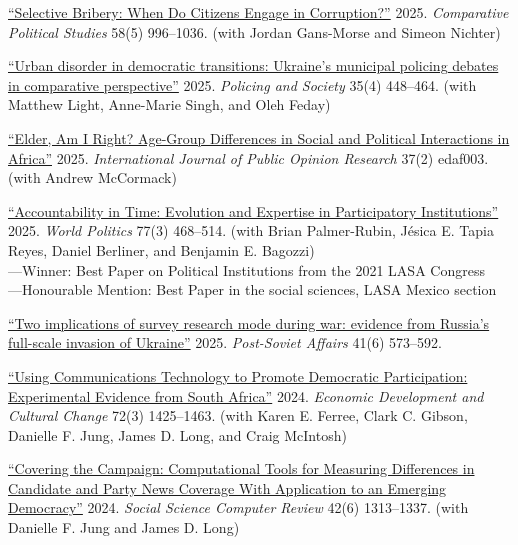 \begin{etaremune}
  \item \href{https://doi.org/10.1177/00104140241259444}{``Selective Bribery: When Do Citizens Engage in Corruption?''} 2025. \textit{Comparative Political Studies} 58(5) 996–1036. (with Jordan Gans-Morse and Simeon Nichter)

  \item \href{https://www.tandfonline.com/doi/abs/10.1080/10439463.2024.2411538}{``Urban disorder in democratic transitions: Ukraine’s municipal policing debates in comparative perspective''} 2025. \textit{Policing and Society} 35(4) 448–464. (with Matthew Light, Anne-Marie Singh, and Oleh Feday)

  \item \href{https://doi.org/10.1093/ijpor/edaf003}{``Elder, Am I Right? Age-Group Differences in Social and Political Interactions in Africa''} 2025. \textit{International Journal of Public Opinion Research} 37(2) edaf003. (with Andrew McCormack)

  \item \href{https://muse.jhu.edu/pub/1/article/964463}{``Accountability in Time: Evolution and Expertise in Participatory Institutions''} 2025. \textit{World Politics} 77(3) 468–514. (with Brian Palmer-Rubin, Jésica E. Tapia Reyes, Daniel Berliner, and Benjamin E. Bagozzi) \\
    ---Winner: Best Paper on Political Institutions from the 2021 LASA Congress \\
    ---Honourable Mention: Best Paper in the social sciences, LASA Mexico section

  \item \href{https://doi.org/10.1080/1060586X.2025.2529114}{``Two implications of survey research mode during war: evidence from Russia’s full-scale invasion of Ukraine''} 2025. \textit{Post-Soviet Affairs} 41(6) 573–592.

  \item \href{https://www.journals.uchicago.edu/doi/abs/10.1086/724010}{``Using Communications Technology to Promote Democratic Participation: Experimental Evidence from South Africa''} 2024. \textit{Economic Development and Cultural Change} 72(3) 1425–1463. (with Karen E. Ferree, Clark C. Gibson, Danielle F. Jung, James D. Long, and Craig McIntosh)

  \item \href{https://doi.org/10.1177/08944393241247420}{``Covering the Campaign: Computational Tools for Measuring Differences in Candidate and Party News Coverage With Application to an Emerging Democracy''} 2024. \textit{Social Science Computer Review} 42(6) 1313–1337. (with Danielle F. Jung and James D. Long)


\end{etaremune}
